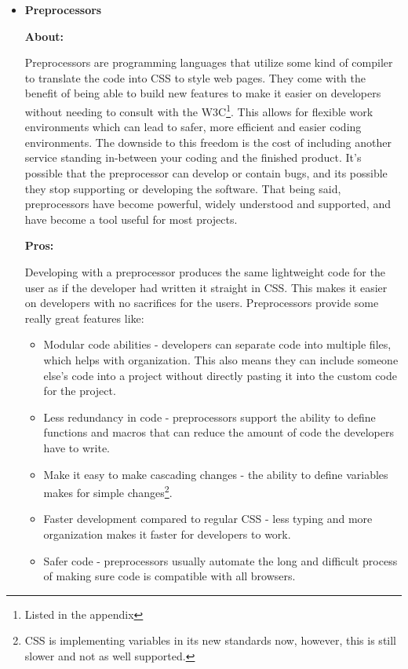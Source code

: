 \documentclass[draftclsnofoot,onecolumn,letterpaper,10pt]{IEEEtran}
\begin{document}
\begin{itemize}
			\item{\textbf{Preprocessors}}

				\textbf{About:}

				Preprocessors are programming languages that utilize some kind of compiler to translate the code into CSS to style web pages.
				They come with the benefit of being able to build new features to make it easier on developers without needing to consult with the W3C\footnote{Listed in the appendix}.
				This allows for flexible work environments which can lead to safer, more efficient and easier coding environments.
				The downside to this freedom is the cost of including another service standing in-between your coding and the finished product.
				It's possible that the preprocessor can develop or contain bugs, and its possible they stop supporting or developing the software.
				That being said, preprocessors have become powerful, widely understood and supported, and have become a tool useful for most projects.

				\noindent \textbf{Pros:}

				Developing with a preprocessor produces the same lightweight code for the user as if the developer had written it straight in CSS. This makes it easier on developers with no sacrifices for the users. Preprocessors provide some really great features like:
				\begin{itemize}
					\item Modular code abilities - developers can separate code into multiple files, which helps with organization. This also means they can include someone else's code into a project without directly pasting it into the custom code for the project.\cite{sass}
					\item Less redundancy in code - preprocessors support the ability to define functions and macros that can reduce the amount of code the developers have to write.
					\item Make it easy to make cascading changes - the ability to define variables makes for simple changes\footnote{CSS is implementing variables in its new standards now, however, this is still slower and not as well supported.}.
					\item Faster development compared to regular CSS - less typing and more organization makes it faster for developers to work.\cite{sass}
					\item Safer code - preprocessors usually automate the long and difficult process of making sure code is compatible with all browsers.
				\end{itemize}


\end{itemize}
\end{document}
